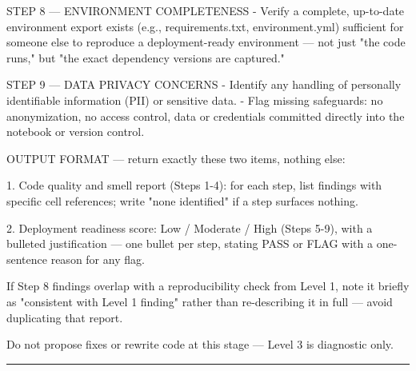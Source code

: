 \documentclass[11pt, a4paper]{article}
\begin{document}
{STEP 8 — ENVIRONMENT COMPLETENESS
- Verify a complete, up-to-date environment export exists (e.g.,
requirements.txt, environment.yml) sufficient for someone else to
reproduce a deployment-ready environment — not just "the code runs,"
but "the exact dependency versions are captured."

STEP 9 — DATA PRIVACY CONCERNS
- Identify any handling of personally identifiable information (PII)
or sensitive data.
- Flag missing safeguards: no anonymization, no access control, data
or credentials committed directly into the notebook or version
control.

OUTPUT FORMAT — return exactly these two items, nothing else:

1. Code quality and smell report (Steps 1-4): for each step, list
findings with specific cell references; write "none identified" if
a step surfaces nothing.

2. Deployment readiness score: Low / Moderate / High (Steps 5-9), with
a bulleted justification — one bullet per step, stating PASS or
FLAG with a one-sentence reason for any flag.

If Step 8 findings overlap with a reproducibility check from Level 1,
note it briefly as "consistent with Level 1 finding" rather than
re-describing it in full — avoid duplicating that report.

Do not propose fixes or rewrite code at this stage — Level 3 is
diagnostic only.
}

\rule{\textwidth}{0.3pt}

\vspace{.3cm}
\end{document}
